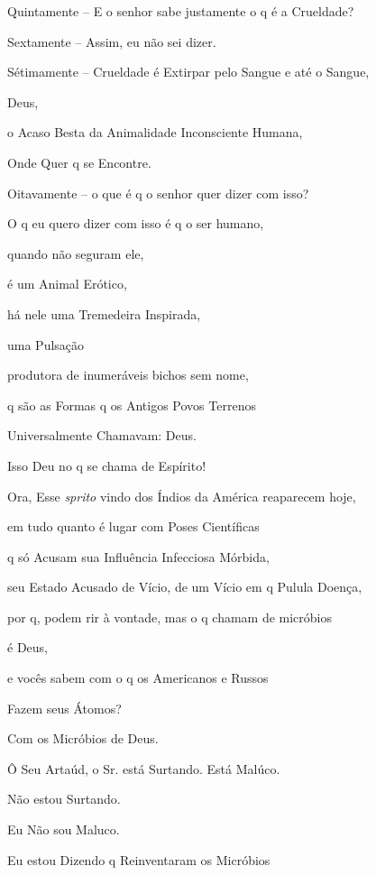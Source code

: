 
Quintamente -- E o senhor sabe justamente o q é a Crueldade?


Sextamente -- Assim, eu não sei dizer.

Sétimamente -- Crueldade é Extirpar pelo Sangue e até o Sangue,

Deus,

o Acaso Besta da Animalidade Inconsciente Humana, 

Onde Quer q se Encontre.


Oitavamente -- o que é q o senhor quer dizer com isso?


O q eu quero dizer com isso é q o ser humano,

quando não seguram ele,

é um Animal Erótico,

há nele uma Tremedeira Inspirada,

uma Pulsação

produtora de inumeráveis bichos sem nome,

q são as Formas q os Antigos Povos Terrenos 

Universalmente Chamavam: Deus.

Isso Deu no q se chama de Espírito!

Ora, Esse \emph{sprito} vindo dos Índios da América reaparecem hoje,

em tudo quanto é lugar com Poses Científicas

q só Acusam sua Influência Infecciosa Mórbida,

seu Estado Acusado de Vício, de um Vício em q Pulula Doença,

por q, podem rir à vontade, mas o q chamam de micróbios

é Deus, 

e vocês sabem com o q os Americanos e Russos

Fazem seus Átomos?

Com os Micróbios de Deus.


Ô Seu Artaúd, o Sr. está Surtando. Está Malúco.


Não estou Surtando.

Eu Não sou Maluco.

Eu estou Dizendo q Reinventaram os Micróbios

